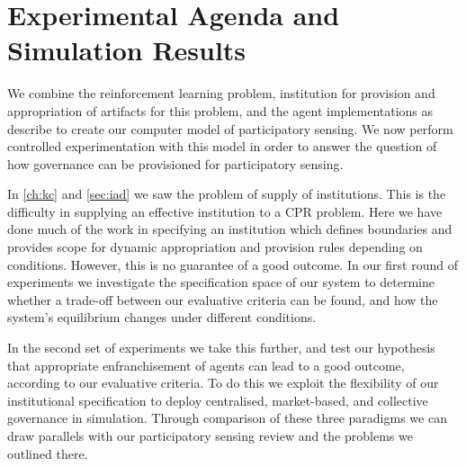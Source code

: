 \section{Experimental Agenda and Simulation Results}

We combine the reinforcement learning problem, institution for provision and
appropriation of artifacts for this problem, and the agent implementations as
describe to create our computer model of participatory sensing. We now perform
controlled experimentation with this model in order to answer the question of
how governance can be provisioned for participatory sensing.

In \autoref{ch:kc} and \autoref{sec:iad} we saw the problem of supply of
institutions. This is the difficulty in supplying an effective institution to
a \ac{CPR} problem. Here we have done much of the work in specifying an
institution which defines boundaries and provides scope for dynamic
appropriation and provision rules depending on conditions. However, this is no
guarantee of a good outcome. In our first round of experiments we investigate
the specification space of our system to determine whether a trade-off between
our evaluative criteria can be found, and how the system's equilibrium changes
under different conditions.

In the second set of experiments we take this further, and test our hypothesis
that appropriate enfranchisement of agents can lead to a good outcome,
according to our evaluative criteria. To do this we exploit the flexibility of
our institutional specification to deploy centralised, market-based, and
collective governance in simulation. Through comparison of these three
paradigms we can draw parallels with our participatory sensing review and the
problems we outlined there.



